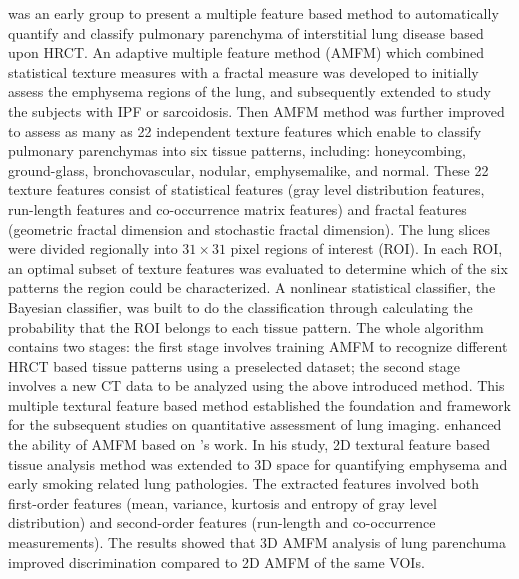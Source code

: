\cite{uppaluri1999interstitial,uppaluri1999computer} was an early group to present a multiple feature based method to automatically quantify and classify pulmonary parenchyma of interstitial lung disease based upon HRCT. An adaptive multiple feature method (AMFM) which combined statistical texture measures with a fractal measure was developed to initially assess the emphysema regions of the lung, and subsequently extended to study the subjects with IPF or sarcoidosis. Then AMFM method was further improved to assess as many as 22 independent texture features which enable to classify pulmonary parenchymas into six tissue patterns, including: honeycombing, ground-glass, bronchovascular, nodular, emphysemalike, and normal. These 22 texture features consist of statistical features (gray level distribution features, run-length features and co-occurrence matrix features) and fractal features (geometric fractal dimension and stochastic fractal dimension). The lung slices were divided regionally into $31 \times 31$ pixel regions of interest (ROI). In each ROI, an optimal subset of texture features was evaluated to determine which of the six patterns the region could be characterized. A nonlinear statistical classifier, the Bayesian classifier, was built to do the classification through calculating the probability that the ROI belongs to each tissue pattern. The whole algorithm contains two stages: the first stage involves training AMFM to recognize different HRCT based tissue patterns using a preselected dataset; the second stage involves a new CT data to be analyzed using the above introduced method. This multiple textural feature based method established the foundation and framework for the subsequent studies on quantitative assessment of lung imaging. \cite{xu2006computer,xu2006mdct} enhanced the ability of AMFM based on \cite{uppaluri1999interstitial,uppaluri1999computer}'s work. In his study, 2D textural feature based tissue analysis method was extended to 3D space for quantifying emphysema and early smoking related lung pathologies. The extracted features involved both first-order features (mean, variance, kurtosis and entropy of gray level distribution) and second-order features (run-length and co-occurrence measurements). The results showed that 3D AMFM analysis of lung parenchuma improved discrimination compared to 2D AMFM of the same VOIs. 

